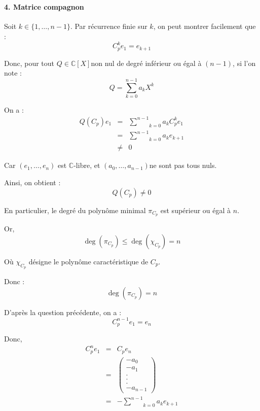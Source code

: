 \

\paragraph{4. Matrice compagnon}

 Soit $k \in \{ 1, \ldots, n - 1 \}$. Par r{\'e}currence finie
sur $k$, on peut montrer facilement que :
\[ C^k_p e_1 = e_{k + 1} \]


Donc, pour tout $Q \in \mathbb{C} [X] $non nul de degr{\'e} inf{\'e}rieur ou
{\'e}gal {\`a} $(n - 1)$, si l'on note :
\[ Q = \underset{k = 0}{\overset{n - 1}{\sum}} a_k X^k \]


On a :
\begin{eqnarray*}
  Q (C_p) e_1 & = & \underset{k = 0}{\overset{n - 1}{\sum}} a_k  C^k_p e_1\\
  & = & \underset{k = 0}{\overset{n - 1}{\sum}} a_k e_{k + 1}\\
  & \neq & 0
\end{eqnarray*}


Car $(e_1, \ldots, e_n)$ est $\mathbb{C}$-libre, et $(a_0, \ldots, a_{n - 1})
$ne sont pas tous nuls.

Ainsi, on obtient :
\[ Q (C_p) \neq 0 \]


En particulier, le degr{\'e} du polyn{\^o}me minimal $\pi_{C_p}$ est
sup{\'e}rieur ou {\'e}gal {\`a} $n$.

Or,
\[ \deg (\pi_{C_p}) \leqslant \deg (\chi_{C_p}) = n \]


O{\`u} $\chi_{C_p}$ d{\'e}signe le polyn{\^o}me caract{\'e}ristique de $C_p$.

Donc :
\[ \deg (\pi_{C_p}) = n \]


 D'apr{\`e}s la question pr{\'e}c{\'e}dente, on a :
\[ C^{n - 1}_p e_1 = e_n \]


Donc,
\begin{eqnarray*}
  C^n_p e_1 & = & C_p e_n\\
  & = & \left( \begin{array}{c}
    - a_0\\
    - a_1\\
    .\\
    .\\
    .\\
    - a_{n - 1}
  \end{array} \right)\\
  & = & - \underset{k = 0}{\overset{n - 1}{\sum}} a_k e_{k + 1}
\end{eqnarray*}


